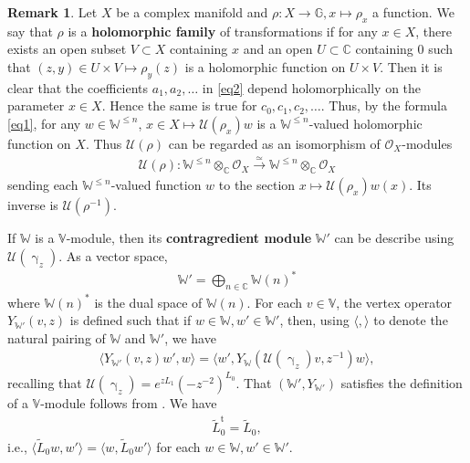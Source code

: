 \documentclass[12pt,a4paper,notitlepage]{article}
\theoremstyle{definition}
\newtheorem{rem}[df]{Remark}
\theoremstyle{plain}
\newcommand{\mc}{\mathcal}
\newcommand{\wtd}{\widetilde}
\newcommand{\tr}{\mathrm{t}} %
\newcommand{\bk}[1]{\langle {#1}\rangle}
\newcommand{\scr}{\mathscr}
\newcommand{\mbb}{\mathbb}
\newcommand{\Vbb}{\mathbb V}
\newcommand{\Wbb}{\mathbb W}
\newcommand{\Cbb}{\mathbb C}
\numberwithin{equation}{section}
\begin{document}
\begin{rem}\label{lb2}
Let $X$ be a complex manifold and $\rho:X\rightarrow\mbb G,x\mapsto \rho_x$ a function. We say that $\rho$ is a \textbf{holomorphic family} of transformations if for any $x\in X$, there exists an open subset $V\subset X$ containing $x$ and an open $U\subset\Cbb$ containing $0$ such that  $(z,y)\in U\times V\mapsto \rho_y(z)$ is a holomorphic function on $U\times V$. Then it is clear that the coefficients $a_1,a_2,\dots$ in \eqref{eq2} depend holomorphically on the parameter $x\in X$. Hence the same is true for $c_0,c_1,c_2,\dots$. Thus, by the formula \eqref{eq1}, for any $w\in\Wbb^{\leq n}$, $x\in X\mapsto \mc U(\rho_x)w$ is a $\Wbb^{\leq n}$-valued holomorphic function on $X$. Thus $\mc U(\rho)$ can be regarded as an isomorphism of  $\scr O_X$-modules 
\begin{align}
\mc U(\rho): \Wbb^{\leq n}\otimes_{\Cbb}\scr O_X\xrightarrow{\simeq}\Wbb^{\leq n}\otimes_{\Cbb}\scr O_X
\end{align}
sending each $\Wbb^{\leq n}$-valued function $w$ to the section $x\mapsto \mc U(\rho_x)w(x)$. \index{U@$\mc U(\rho)$} Its inverse is  $\mc U(\rho^{-1})$.
\end{rem}







If $\Wbb$ is a $\Vbb$-module, then its \textbf{contragredient module} $\Wbb'$ \index{W'@$\Wbb'$} can be describe using $\mc U(\upgamma_z)$. As a vector space,
\begin{align*}
\Wbb'=\bigoplus_{n\in\Cbb}\Wbb{(n)}^*
\end{align*}
where $\Wbb{(n)}^*$ is the dual space of $\Wbb{(n)}$. For each $v\in\Vbb$, the vertex operator $Y_{\Wbb'}(v,z)$ is defined such that if $w\in\Wbb,w'\in\Wbb'$, then, using $\bk{,}$ to denote the natural pairing of $\Wbb$ and $\Wbb'$, we have 
\begin{align}
\bk{Y_{\Wbb'}(v,z)w',w}=\bk{w',Y_\Wbb(\mc U(\upgamma_z)v,z^{-1})w},\label{eq62}
\end{align}
recalling that $\mc U(\upgamma_z)=e^{zL_1}(-z^{-2})^{L_0}$. That  $(\Wbb',Y_{\Wbb'})$ satisfies the definition of a $\Vbb$-module follows from \cite{FHL93}. We have 
\begin{align}
	\wtd L_0^\tr=\wtd L_0,\label{eq99}
\end{align}
i.e., $\bk{\wtd L_0w,w'}=\bk{w,\wtd L_0w'}$ for each $w\in\Wbb,w'\in\Wbb'$.
\end{document}
